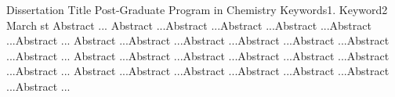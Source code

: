 \documentclass[diss]{mdtfurb}
\begin{document}
\begin{abstract}
Este é o resumo do trabalho ... Este é o resumo do trabalho ...
Este é o resumo do trabalho ... Este é o resumo do trabalho ...
Este é o resumo do trabalho ... Este é o resumo do trabalho ...
Este é o resumo do trabalho ... Este é o resumo do trabalho ...
Este é o resumo do trabalho ... Este é o resumo do trabalho ...
Este é o resumo do trabalho ... Este é o resumo do trabalho ...
\end{abstract}

\begin{englishabstract}
{Dissertation Title}
{Post-Graduate Program in Chemistry}
{Keywords1. Keyword2}
{March}
{st}
Abstract ... Abstract ...Abstract ...Abstract ...Abstract ...Abstract ...Abstract ...
Abstract ...Abstract ...Abstract ...Abstract ...Abstract ...Abstract ...Abstract ...
Abstract ...Abstract ...Abstract ...Abstract ...Abstract ...Abstract ...Abstract ...
Abstract ...Abstract ...Abstract ...Abstract ...Abstract ...Abstract ...Abstract ...
\end{englishabstract}


\listoffigures

\listoftables

\end{document}

